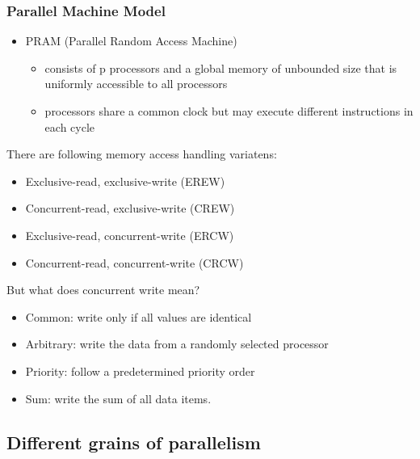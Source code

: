 \hypertarget{parallel-machine-model}{%
\subsubsection{Parallel Machine Model}\label{parallel-machine-model}}

\begin{itemize}
\tightlist
\item
  PRAM (Parallel Random Access Machine)

  \begin{itemize}
  \tightlist
  \item
    consists of p processors and a global memory of unbounded size that
    is uniformly accessible to all processors
  \item
    processors share a common clock but may execute different
    instructions in each cycle
  \end{itemize}
\end{itemize}

There are following memory access handling variatens:

\begin{itemize}
\tightlist
\item
  Exclusive-read, exclusive-write (EREW)
\item
  Concurrent-read, exclusive-write (CREW)
\item
  Exclusive-read, concurrent-write (ERCW)
\item
  Concurrent-read, concurrent-write (CRCW)
\end{itemize}

But what does concurrent write mean?

\begin{itemize}
\tightlist
\item
  Common: write only if all values are identical
\item
  Arbitrary: write the data from a randomly selected processor
\item
  Priority: follow a predetermined priority order
\item
  Sum: write the sum of all data items.
\end{itemize}

\hypertarget{different-grains-of-parallelism}{%
\subsection{Different grains of
parallelism}\label{different-grains-of-parallelism}}

